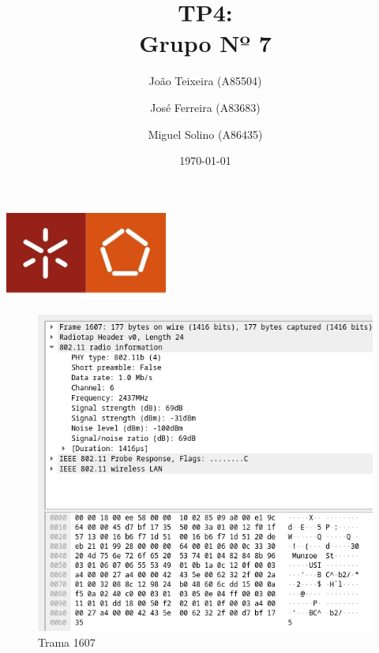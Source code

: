 \documentclass[a4paper]{report}
\begin{document}
\title{TP4:\\ 
    \large Grupo Nº 7}
\author{João Teixeira (A85504) \and José Ferreira (A83683) \and Miguel Solino (A86435)}

\date{\today}

\begin{center}
    \begin{minipage}{0.75\linewidth}
        \centering
        \includegraphics[width=0.4\textwidth]{images/eng.jpeg}\par\vspace{1cm}
        \vspace{1cm}
        \href{https://www.uminho.pt/PT}
        {\color{black}{\scshape\LARGE Universidade do Minho}} \par
        \vspace{1cm}
        \href{https://www.di.uminho.pt/}
        {\color{black}{\scshape\Large Departamento de Informática}} \par
        \maketitle
    \end{minipage}
\end{center}

\tableofcontents

\begin{figure}[H]
    \centering 
    \includegraphics[width=\textwidth]{images/trama1607.png}  
    \caption{Trama 1607}
    \label{fig:trama1607}
\end{figure}
\end{document}
